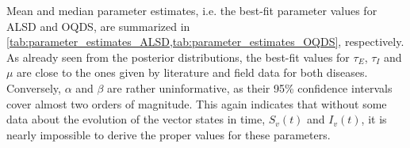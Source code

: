 Mean and median parameter estimates, i.e. the best-fit parameter values for
ALSD and OQDS, are summarized in
\cref{tab:parameter_estimates_ALSD,tab:parameter_estimates_OQDS}, respectively.
As already seen from the posterior distributions, the best-fit values for
$\tau_E$, $\tau_I$ and $\mu$ are close to the ones given by literature and
field data for both diseases. Conversely, $\alpha$ and $\beta$ are rather
uninformative, as their 95\% confidence intervals cover almost two orders of
magnitude. This again indicates that without some data about the evolution of
the vector states in time, $S_v(t)$ and $I_v(t)$, it is nearly impossible to
derive the proper values for these parameters.

\begin{table}[H]
    \centering
    \caption{Estimated epidemiological parameters from Bayesian model
        fitting to the disease progression curve of ALSD in Mallorca.}
    \label{tab:parameter_estimates_ALSD}
\end{table}

